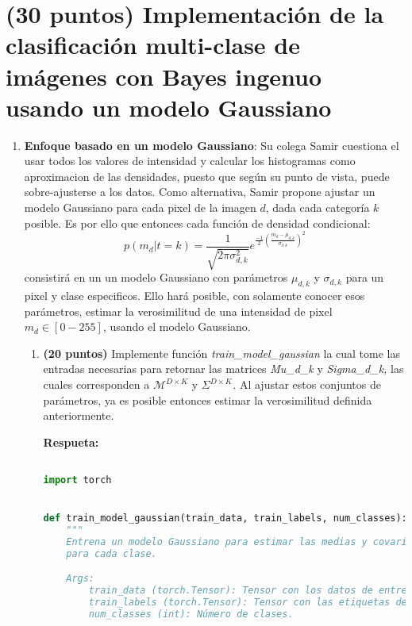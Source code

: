\documentclass[spanish]{article}
\begin{document}
\section{(30 puntos) Implementación de la clasificación multi-clase de imágenes
con Bayes ingenuo usando un modelo Gaussiano}
\begin{enumerate}
\item \textbf{Enfoque basado en un modelo Gaussiano}: Su colega Samir cuestiona
el usar todos los valores de intensidad y calcular los histogramas
como aproximacion de las densidades, puesto que según su punto de
vista, puede sobre-ajusterse a los datos. Como alternativa, Samir
propone ajustar un modelo Gaussiano para cada pixel de la imagen $d$,
dada cada categoría $k$ posible. Es por ello que entonces cada función
de densidad condicional: 
\[
p\left(m_{d}|t=k\right)=\frac{1}{\sqrt{2\pi\sigma_{d,k}^{2}}}e^{\frac{-1}{2}\left(\frac{m_{d}-\mu_{d,k}}{\sigma_{d,k}}\right)^{2}}
\]
consistirá en un un modelo Gaussiano con parámetros $\mu_{d,k}$ y
$\sigma_{d,k}$ para un pixel y clase especificos. Ello hará posible,
con solamente conocer esos parámetros, estimar la verosimilitud de
una intensidad de pixel $m_{d}\in\left[0-255\right]$, usando el modelo
Gaussiano.
\begin{enumerate}
\item \textbf{(20 puntos)} Implemente función \emph{train\_model\_gaussian
}la cual tome las entradas necesarias para retornar las\emph{ }matrices\emph{
Mu\_d\_k }y \emph{Sigma\_d\_k, }las cuales corresponden a \emph{$\mathcal{M}^{D\times K}$
}y\emph{ $\Sigma^{D\times K}$. }Al ajustar estos conjuntos de parámetros,
ya es posible entonces estimar la verosimilitud definida anteriormente.

\vspace{15px}

\textbf{Respueta:}
\vspace{15px}

\begin{lstlisting}[language=Python, caption=Implementacion Modelo Gaussiano]

import torch


def train_model_gaussian(train_data, train_labels, num_classes):
    """
    Entrena un modelo Gaussiano para estimar las medias y covarianzas de cada píxel
    para cada clase.

    Args:
        train_data (torch.Tensor): Tensor con los datos de entrenamiento de forma [N, 1, 32, 32].
        train_labels (torch.Tensor): Tensor con las etiquetas de entrenamiento de forma [N].
        num_classes (int): Número de clases.


\end{lstlisting}
\end{enumerate}
\end{enumerate}
\end{document}
